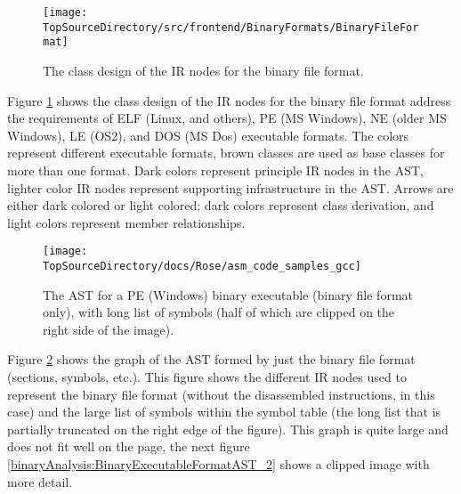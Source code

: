
\begin{figure}
\texttt{[image: \\TopSourceDirectory/src/frontend/BinaryFormats/BinaryFileFormat]}
\caption{The class design of the IR nodes for the binary file format.} 

\label{binaryAnalysis:BinaryExecutableFormatDesign}
\end{figure}

Figure \ref{binaryAnalysis:BinaryExecutableFormatDesign} shows the class design of the IR
nodes for the binary file format address the
requirements of ELF (Linux, and others), PE (MS Windows), NE (older MS Windows), 
LE (OS\/2), and DOS (MS Dos) executable formats.  The colors represent different
executable formats, brown classes are used as base classes for more than one
format. Dark colors represent principle IR nodes in the AST, lighter color IR nodes
represent supporting infrastructure in the AST.  Arrows are either dark colored or
light colored; dark colors represent class derivation, and light colors represent
member relationships.

\begin{figure}
\texttt{[image: \\TopSourceDirectory/docs/Rose/asm\_code\_samples\_gcc]}
\caption{The AST for a PE (Windows) binary executable (binary file format only), with long
    list of symbols (half of which are clipped on the right side of the image).} 

\label{binaryAnalysis:BinaryExecutableFormatAST_1}
\end{figure}

Figure \ref{binaryAnalysis:BinaryExecutableFormatAST_1} shows the graph of the AST
formed by just the binary file format (sections, symbols, etc.).  This figure shows
the different IR nodes used to represent the binary file format (without the disassembled 
instructions, in this case) and the large list of symbols within the symbol table (the 
long list that is partially truncated on the right edge of the figure).
This graph is quite large and does not fit well on the page, the next figure
\ref{binaryAnalysis:BinaryExecutableFormatAST_2} shows a clipped image with more detail.


